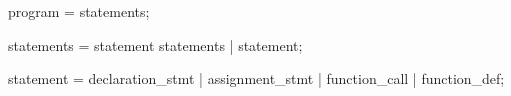 program     =   statements;

statements  =   statement statements |
                statement;
                
statement   =   declaration_stmt |
                assignment_stmt |
                function_call |
                function_def;